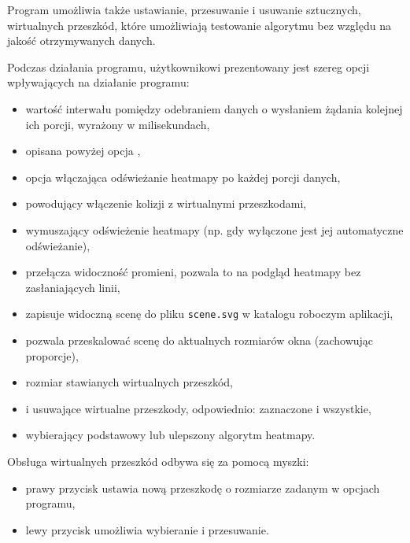 Program umożliwia także ustawianie, przesuwanie i usuwanie sztucznych, wirtualnych przeszkód, które umożliwiają testowanie algorytmu bez względu na jakość otrzymywanych danych.

Podczas działania programu, użytkownikowi prezentowany jest szereg opcji wpływających na działanie programu:
\begin{itemize}
 \item {} wartość interwału pomiędzy odebraniem danych o wysłaniem żądania kolejnej ich porcji, wyrażony w milisekundach,
 \item opisana powyżej opcja ,
 \item {} opcja włączająca odświeżanie heatmapy po każdej porcji danych,
 \item {} powodujący włączenie kolizji z wirtualnymi przeszkodami,
 \item {} wymuszający odświeżenie heatmapy (np. gdy wyłączone jest jej automatyczne odświeżanie),
 \item {} przełącza widoczność promieni, pozwala to na podgląd heatmapy bez zasłaniających linii,
 \item {} zapisuje widoczną scenę do pliku \texttt{scene.svg} w katalogu roboczym aplikacji,
 \item {} pozwala przeskalować scenę do aktualnych rozmiarów okna (zachowując proporcje),
 \item {} rozmiar stawianych wirtualnych przeszkód,
 \item {} i  usuwające wirtualne przeszkody, odpowiednio: zaznaczone i wszystkie,
 \item {} wybierający podstawowy lub ulepszony algorytm heatmapy.
\end{itemize}

Obsługa wirtualnych przeszkód odbywa się za pomocą myszki:
\begin{itemize}
 \item prawy przycisk ustawia nową przeszkodę o rozmiarze zadanym w opcjach programu,
 \item lewy przycisk umożliwia wybieranie i przesuwanie.
\end{itemize}
